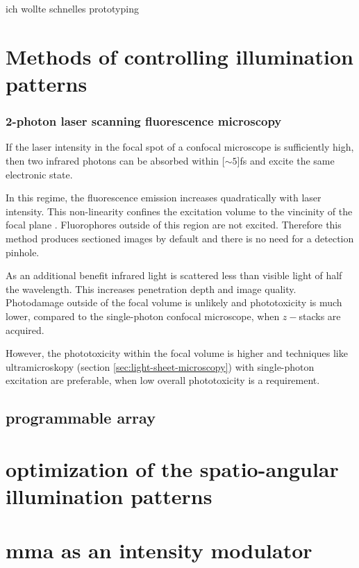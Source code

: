 \documentclass[oneside,a4paper,12pt,BCOR20mm,DIV14]{scrbook} %
\begin{document}
ich wollte schnelles prototyping




\chapter{Methods of controlling illumination patterns}
\label{sec:illum-patterns}
\subsection{2-photon laser scanning fluorescence microscopy}
\label{sec:2-photon}
If the laser intensity in the focal spot of a confocal microscope is
sufficiently high, then two infrared photons can be absorbed within
\unit[$\sim 5$]{fs} and excite the same electronic state.

In this regime, the fluorescence emission increases quadratically with
laser intensity. This non-linearity confines the excitation volume to
the vincinity of the focal plane \citep{Denk1990}. Fluorophores
outside of this region are not excited. Therefore this method produces
sectioned images by default and there is no need for a detection
pinhole.

As an additional benefit infrared light is scattered less than visible
light of half the wavelength. This increases penetration depth and
image quality. Photodamage outside of the focal volume is unlikely and
phototoxicity is much lower, compared to the single-photon confocal
microscope, when $z-$stacks are acquired.

However, the phototoxicity within the focal volume is higher and
techniques like ultramicroskopy (section
\ref{sec:light-sheet-microscopy}) with single-photon excitation are
preferable, when low overall phototoxicity is a requirement.

\section{programmable array}
\cite{Caarls2011}



\chapter{optimization of the spatio-angular illumination patterns}
\label{sec:optimization}
\chapter{mma as an intensity modulator}
\label{sec:mma}

\end{document}
